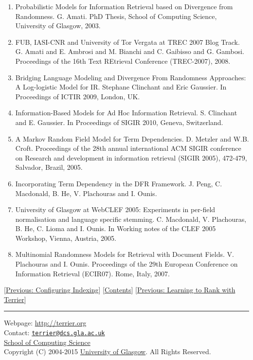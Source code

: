 \begin{enumerate}
\tightlist
\item
  \href{}{}Probabilistic Models for Information Retrieval based on
  Divergence from Randomness. G. Amati. PhD Thesis, School of Computing
  Science, University of Glasgow, 2003.
\item
  \href{}{}FUB, IASI-CNR and University of Tor Vergata at TREC 2007 Blog
  Track. G. Amati and E. Ambrosi and M. Bianchi and C. Gaibisso and G.
  Gambosi. Proceedings of the 16th Text REtrieval Conference
  (TREC-2007), 2008.
\item
  \href{}{}Bridging Language Modeling and Divergence From Randomness
  Approaches: A Log-logistic Model for IR. Stephane Clinchant and Eric
  Gaussier. In Proceedings of ICTIR 2009, London, UK.
\item
  \href{}{}Information-Based Models for Ad Hoc Information Retrieval. S.
  Clinchant and E. Gaussier. In Proceedings of SIGIR 2010, Geneva,
  Switzerland.
\item
  \href{}{}A Markov Random Field Model for Term Dependencies. D. Metzler
  and W.B. Croft. Proceedings of the 28th annual international ACM SIGIR
  conference on Research and development in information retrieval (SIGIR
  2005), 472-479, Salvador, Brazil, 2005.
\item
  \href{}{}Incorporating Term Dependency in the DFR Framework. J. Peng,
  C. Macdonald, B. He, V. Plachouras and I. Ounis.
\item
  \href{}{}University of Glasgow at WebCLEF 2005: Experiments in
  per-field normalisation and language specific stemming. C. Macdonald,
  V. Plachouras, B. He, C. Lioma and I. Ounis. In Working notes of the
  CLEF 2005 Workshop, Vienna, Austria, 2005.
\item
  \href{}{}Multinomial Randomness Models for Retrieval with Document
  Fields. V. Plachouras and I. Ounis. Proceedings of the 29th European
  Conference on Information Retrieval (ECIR07). Rome, Italy, 2007.
\end{enumerate}

{[}\href{configure_indexing.html}{Previous: Configuring Indexing}{]}
{[}\href{index.html}{Contents}{]} {[}\href{learning.html}{Previous:
Learning to Rank with Terrier}{]}

\begin{center}\rule{0.5\linewidth}{\linethickness}\end{center}

Webpage: \url{http://terrier.org}\\
Contact:
\href{mailto:terrier@dcs.gla.ac.uk}{\nolinkurl{terrier@dcs.gla.ac.uk}}\\
\href{http://www.dcs.gla.ac.uk/}{School of Computing Science}\\
Copyright (C) 2004-2015 \href{http://www.gla.ac.uk/}{University of
Glasgow}. All Rights Reserved.
